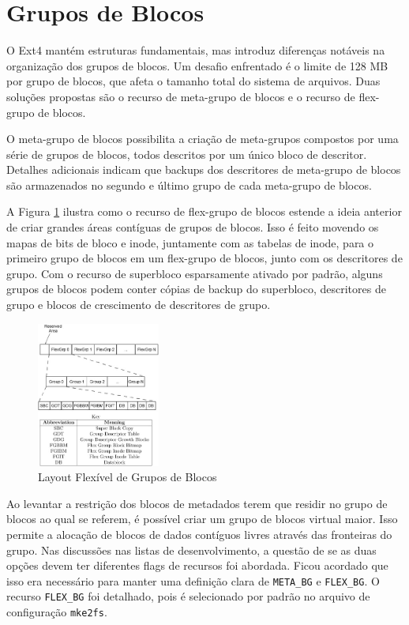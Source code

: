 \documentclass[
	12pt,				%
	openright,			%
	oneside,			%
	a4paper,			%
	chapter=TITLE,		%
	english,			%
	french,				%
	spanish,			%
	brazil				%
	]{abntex2}
\theoremstyle{definition}
\begin{document}

\section{Grupos de Blocos}
O Ext4 mantém estruturas fundamentais, mas introduz diferenças notáveis na organização dos grupos 
de blocos. Um desafio enfrentado é o limite de 128 MB por grupo de blocos, que afeta o tamanho total 
do sistema de arquivos. Duas soluções propostas são o recurso de meta-grupo de blocos e o recurso de 
flex-grupo de blocos.

O meta-grupo de blocos possibilita a criação de meta-grupos compostos por uma série de grupos de 
blocos, todos descritos por um único bloco de descritor. Detalhes adicionais indicam que backups 
dos descritores de meta-grupo de blocos são armazenados no segundo e último grupo de cada meta-grupo de blocos.

A Figura \ref{fig:9} ilustra como o recurso de flex-grupo de blocos estende a ideia anterior 
de criar grandes áreas contíguas de grupos de blocos. Isso é feito movendo os mapas de bits de bloco e 
inode, juntamente com as tabelas de inode, para o primeiro grupo de blocos em um flex-grupo de blocos, 
junto com os descritores de grupo. Com o recurso de superbloco esparsamente ativado por padrão, alguns
grupos de blocos podem conter cópias de backup do superbloco, descritores de grupo e blocos de 
crescimento de descritores de grupo.

\begin{figure}[H]
	\centering
	\includegraphics[width=0.36\textwidth]{fig9.jpg}
	\caption{Layout Flexível de Grupos de Blocos}
	\label{fig:9}
\end{figure}

Ao levantar a restrição dos blocos de metadados terem que residir no grupo de blocos ao qual se 
referem, é possível criar um grupo de blocos virtual maior. Isso permite a alocação de blocos de
dados contíguos livres através das fronteiras do grupo. Nas discussões nas listas de desenvolvimento, 
a questão de se as duas opções devem ter diferentes flags de recursos foi abordada. Ficou acordado 
que isso era necessário para manter uma definição clara de \texttt{META\_BG} e \texttt{FLEX\_BG}. 
O recurso \texttt{FLEX\_BG} foi detalhado, pois é selecionado por padrão no arquivo de configuração \texttt{mke2fs}.
\end{document}
